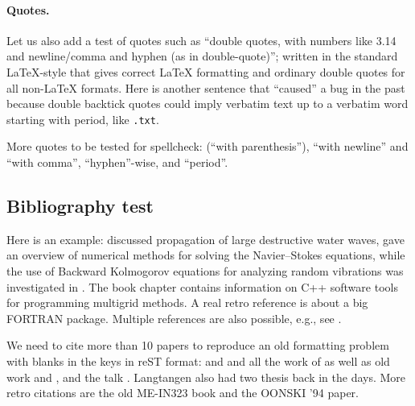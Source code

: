 \documentclass[%
oneside,                 %
final,                   %
10pt]{article}
\newenvironment{doconceexercise}{}{}
\newcounter{doconceexercisecounter}
\theoremstyle{definition}
\begin{document}
\begin{enumerate}
\eccq


\paragraph{Quotes.}
Let us also add a test of quotes such as ``double quotes, with numbers
like 3.14 and newline/comma and hyphen (as in double-quote)''; written
in the standard LaTeX-style that gives correct {\LaTeX} formatting and
ordinary double quotes for all non-LaTeX formats.  Here is another
sentence that ``caused'' a bug in the past because double backtick
quotes could imply verbatim text up to a verbatim word starting with
period, like \texttt{.txt}.

More quotes to be tested for spellcheck:
(``with parenthesis''), ``with newline''
and ``with comma'', ``hyphen''-wise, and ``period''.

\subsection{Bibliography test}

Here is an example: \cite{Langtangen_Pedersen_2002} discussed propagation of
large destructive water waves, \cite{Langtangen_et_al_2002} gave
an overview of numerical methods for solving the Navier--Stokes equations,
while the use of Backward Kolmogorov equations for analyzing
random vibrations was investigated in \cite{Langtangen_1994a}.
The book chapter \cite{Mardal_et_al_2003a} contains information on
C++ software tools for programming multigrid methods. A real retro
reference is \cite{Langtangen_1988d} about a big FORTRAN package.
Multiple references are also possible, e.g., see
\cite{Langtangen_Pedersen_2002,Mardal_et_al_2003a}.

We need to cite more than 10 papers to reproduce an old formatting
problem with blanks in the keys in reST format:
\cite{Langtangen_1992c,Langtangen_1994a,Mortensen_et_al_2011,Langtangen_Pedersen_2002}
and
\cite{Langtangen_et_al_2002,Glimsdal_et_al_20006,Rahman_et_al_2006b,Haga_et_al_2011a,Langtangen_2003a,Langtangen_2008a,Langtangen:95}
and all the work of
\cite{Langtangen_2012,Mardal_et_al_2003a,Jeberg_et_al_2004} as well as
old work \cite{Langtangen_1988d} and \cite{Langtangen_1989e}, and the
talk \cite{Langtangen_talk_2007a}.
Langtangen also had two thesis \cite{Langtangen:85,Langtangen_1989e}
back in the days.
More retro citations are
the old ME-IN323 book \cite{Langtangen:91} and the
\cite{Langtangen:94b} OONSKI '94 paper.

\begin{doconceexercise}


\end{doconceexercise}
\end{enumerate}
\end{document}
